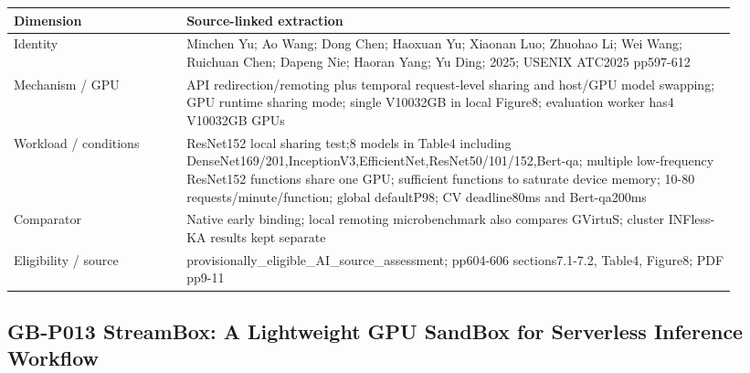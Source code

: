 \documentclass[12pt,a4paper]{article}
\begin{document}
{\small\begin{longtable}{>{\raggedright\arraybackslash}p{0.22\linewidth}>{\raggedright\arraybackslash}p{0.7\linewidth}}
\toprule
Dimension & Source-linked extraction\\\midrule
\endhead
Identity & Minchen Yu; Ao Wang; Dong Chen; Haoxuan Yu; Xiaonan Luo; Zhuohao Li; Wei Wang; Ruichuan Chen; Dapeng Nie; Haoran Yang; Yu Ding; 2025; USENIX ATC2025 pp597-612\\
Mechanism /\allowbreak{} GPU & API redirection/\allowbreak{}remoting plus temporal request-level sharing and host/\allowbreak{}GPU model swapping; GPU runtime sharing mode; single V10032GB in local Figure8; evaluation worker has4 V10032GB GPUs\\
Workload /\allowbreak{} conditions & ResNet152 local sharing test;8 models in Table4 including DenseNet169/\allowbreak{}201,InceptionV3,EfficientNet,ResNet50/\allowbreak{}101/\allowbreak{}152,Bert-qa; multiple low-frequency ResNet152 functions share one GPU; sufficient functions to saturate device memory; 10-80 requests/\allowbreak{}minute/\allowbreak{}function; global defaultP98; CV deadline80ms and Bert-qa200ms\\
Comparator & Native early binding; local remoting microbenchmark also compares GVirtuS; cluster INFless-KA results kept separate\\
Eligibility /\allowbreak{} source & provisionally\_\allowbreak{}eligible\_\allowbreak{}AI\_\allowbreak{}source\_\allowbreak{}assessment; pp604-606 sections7.1-7.2, Table4, Figure8; PDF pp9-11\\
\bottomrule
\end{longtable}}

\subsection*{GB-P013 StreamBox:\allowbreak{} A Lightweight GPU SandBox for Serverless Inference Workflow}
\cite{GB-P013}
\end{document}
